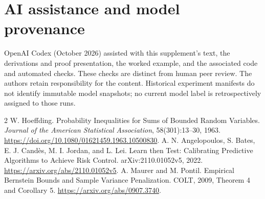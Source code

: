 \documentclass[10pt,letterpaper]{article}
\begin{document}

\section*{AI assistance and model provenance}
OpenAI Codex (October 2026) assisted with this supplement's text, the
derivations and proof presentation, the worked example, and the associated
code and automated checks. These checks are distinct from human peer review.
The authors retain responsibility for the content. Historical experiment
manifests do not identify immutable model snapshots; no current model label
is retrospectively assigned to those runs.
\begin{thebibliography}{2}
 W. Hoeffding. Probability Inequalities for Sums of
Bounded Random Variables. \emph{Journal of the American Statistical
Association}, 58(301):13--30, 1963.
\url{https://doi.org/10.1080/01621459.1963.10500830}.
 A. N. Angelopoulos, S. Bates, E. J. Cand\`es,
M. I. Jordan, and L. Lei. Learn then Test: Calibrating Predictive
Algorithms to Achieve Risk Control. arXiv:2110.01052v5, 2022.
\url{https://arxiv.org/abs/2110.01052v5}.
 A. Maurer and M. Pontil. Empirical Bernstein Bounds
and Sample Variance Penalization. COLT, 2009, Theorem 4 and Corollary 5.
\url{https://arxiv.org/abs/0907.3740}.
\end{thebibliography}
\end{document}
